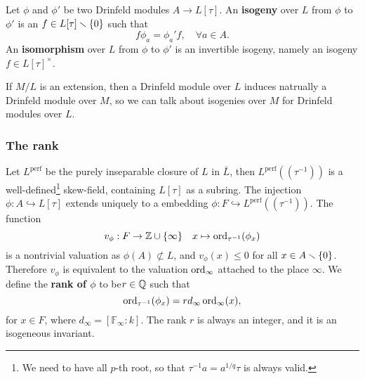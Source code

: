 \documentclass{article}
\newcommand{\F}{\mathbb{F}}
\newcommand{\perf}{\mathrm{perf}}
\renewcommand{\O}{\mathcal{O}}
\begin{document}
Let $\phi$ and $\phi'$ be two Drinfeld modules $A\to L[\tau]$.
An \textbf{isogeny} over $L$ from $\phi$ to $\phi'$
is an $f\in L[\tau]\smallsetminus\{0\}$ such that \[f\phi_a = \phi_a'f,\quad\forall a\in A.\]
An \textbf{isomorphism} over $L$ from $\phi$ to $\phi'$ is an invertible isogeny, namely an isogeny $f\in L[\tau]^\times$.

If $M/L$ is an extension,
then a Drinfeld module over $L$ induces natrually a Drinfeld module over $M$,
so we can talk about isogenies over $M$ for Drinfeld modules over $L$.


\subsubsection{The rank}

Let $L^\perf$ be the purely inseparable closure of $L$ in $\bar L$,
then $L^\perf(\!(\tau^{-1})\!)$ is a well-defined\footnote{
    We need to have all $p$-th root,
    so that $\tau^{-1}a = a^{1/q}\tau$ is always valid.
} skew-field, containing $L[\tau]$ as a subring.
The injection $\phi : A\hookrightarrow L[\tau]$ extends uniquely to a embedding
$\phi : F\hookrightarrow L^{\perf}(\!(\tau^{-1})\!)$.
The function \[v_\phi : F\to \mathbb{Z}\cup\{\infty\}\quad x\mapsto \operatorname{ord}_{\tau^{-1}}(\phi_x) \]
is a nontrivial valuation as $\phi(A)\not\subset L$, and $v_\phi(x)\le 0$ for all $x\in A\smallsetminus\{0\}$.
Therefore $v_\phi$ is equivalent to the valuation $\operatorname{ord}_\infty$ attached to the place $\infty$.
We define the \textbf{rank of $\phi$} to be$r\in\mathbb{Q}$ such that
\begin{equation}\label{eq: def of rank}
    \operatorname{ord}_{\tau^{-1}}(\phi_x) = rd_\infty\operatorname{ord}_\infty(x),
\end{equation}
for $x\in F$, where $d_\infty = [\F_\infty : k]$.
The rank $r$ is always an integer, and it is an isogeneous invariant.


\end{document}
